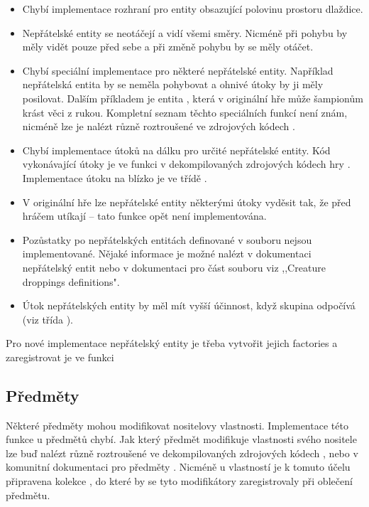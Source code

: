 \begin{itemize}
\item Chybí implementace rozhraní  pro entity obsazující polovinu prostoru dlaždice.
\item Nepřátelské entity se neotáčejí a vidí všemi směry. Nicméně při pohybu by měly vidět pouze před sebe a při změně pohybu by se měly otáčet.
\item Chybí speciální implementace pro některé nepřátelské entity. Například nepřátelská entita  by se neměla pohybovat a ohnivé
    útoky by ji měly posilovat. Dalším příkladem je entita , která v originální hře může šampionům krást věci z rukou. Kompletní seznam
	těchto speciálních funkcí  není znám, nicméně lze je nalézt různě roztroušené ve zdrojových kódech \cite{DMDecompilation}.
\item Chybí implementace útoků na dálku pro určité nepřátelské entity. Kód vykonávající útoky je ve funkci  
	v dekompilovaných zdrojových kódech hry \cite{DMDecompilation}. Implementace útoku na blízko je ve třídě .

\item V originální hře lze nepřátelské entity některými útoky vyděsit tak, že před hráčem utíkají -- tato funkce opět není implementována.
\item Pozůstatky po nepřátelských entitách definované v souboru  nejsou implementované. Nějaké informace 
je možné nalézt v dokumentaci nepřátelský entit \cite{DMCreatures} nebo v dokumentaci pro část souboru  \cite{DMGraphicsDAT} viz ,,Creature droppings definitions".
\item Útok nepřátelských entity by měl mít vyšší účinnost, když skupina odpočívá (viz třída ).

\end{itemize}
Pro nové implementace nepřátelský entity je třeba vytvořit jejich factories a zaregistrovat je ve funkci 


\subsection{Předměty}
Některé předměty mohou modifikovat nositelovy vlastnosti. Implementace této funkce u předmětů chybí. Jak který předmět modifikuje 
vlastnosti svého nositele lze buď nalézt různě roztroušené ve dekompilovaných zdrojových kódech \cite{DMDecompilation}, nebo v komunitní dokumentaci pro předměty \cite{DMItems}.
Nicméně u vlastností je k tomuto účelu připravena kolekce , do které by se tyto modifikátory zaregistrovaly při oblečení předmětu.


